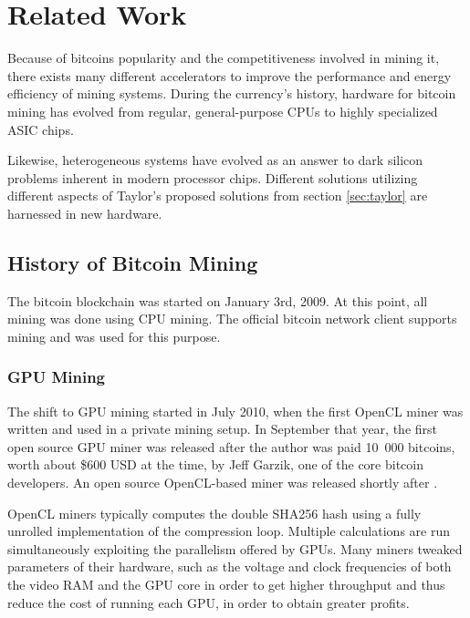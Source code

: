 \chapter{Related Work}
\label{cha:related-work}


Because of bitcoins popularity and the competitiveness involved in mining it, there exists
many different accelerators to improve the performance and energy efficiency of mining systems.
During the currency's history, hardware for bitcoin mining has evolved from regular, general-purpose
CPUs to highly specialized ASIC chips.

Likewise, heterogeneous systems have evolved as an answer to dark silicon problems inherent in
modern processor chips. Different solutions utilizing different aspects of Taylor's proposed
solutions from section \ref{sec:taylor} are harnessed in new hardware.

\section{History of Bitcoin Mining}

The bitcoin blockchain was started on January 3rd, 2009. At this point, all mining was done
using CPU mining. The official bitcoin network client supports mining and was used for this
purpose. \cite{bitcoin-history}

\subsection{GPU Mining}
The shift to GPU mining started in July 2010, when the first OpenCL miner was written and
used in a private mining setup. In September that year, the first open source GPU miner
was released after the author was paid 10~000 bitcoins, worth about \$600 USD at the time,
by Jeff Garzik, one of the core bitcoin developers. An open source OpenCL-based miner was
released shortly after \cite{bitcoin-history}.

OpenCL miners typically computes the double SHA256 hash using a fully unrolled implementation
of the compression loop. Multiple calculations are run simultaneously exploiting the parallelism
offered by GPUs. Many miners tweaked parameters of their hardware, such as the voltage and
clock frequencies of both the video RAM and the GPU core in order to get higher throughput
and thus reduce the cost of running each GPU, in order to obtain greater profits.

